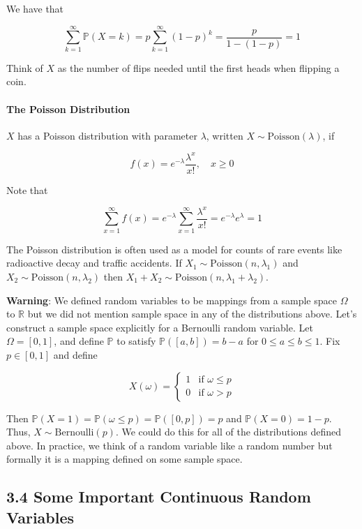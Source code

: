 We have that

\[ \sum_{k=1}^\infty \mathbb{P}(X = k) = p \sum_{k=1}^\infty (1 - p)^k = \frac{p}{1 - (1 - p)} = 1 \]

Think of \(X\) as the number of flips needed until the first heads when
flipping a coin.

\paragraph{The Poisson Distribution}\label{the-poisson-distribution}

\(X\) has a Poisson distribution with parameter \(\lambda\), written
\(X \sim \text{Poisson}(\lambda)\), if

\[ f(x) = e^{-\lambda} \frac{\lambda^x}{x!}, \quad x \geq 0 \]

Note that

\[ \sum_{x=1}^\infty f(x) = e^{-\lambda} \sum_{x=1}^\infty \frac{\lambda^x}{x!} = e^{-\lambda} e^\lambda = 1 \]

The Poisson distribution is often used as a model for counts of rare
events like radioactive decay and traffic accidents. If
\(X_1 \sim \text{Poisson}(n, \lambda_1)\) and
\(X_2 \sim \text{Poisson}(n, \lambda_2)\) then
\(X_1 + X_2 \sim \text{Poisson}(n, \lambda_1 + \lambda_2)\).

\textbf{Warning}: We defined random variables to be mappings from a
sample space \(\Omega\) to \(\mathbb{R}\) but we did not mention sample
space in any of the distributions above. Let's construct a sample space
explicitly for a Bernoulli random variable. Let \(\Omega = [0, 1]\), and
define \(\mathbb{P}\) to satisfy \(\mathbb{P}([a, b]) = b - a\) for
\(0 \leq a \leq b \leq 1\). Fix \(p \in [0, 1]\) and define

\[ X(\omega) = \begin{cases}
1 &\text{if }\omega \leq p \\
0 &\text{if }\omega > p
\end{cases} \]

Then
\(\mathbb{P}(X = 1) = \mathbb{P}(\omega \leq p) = \mathbb{P}([0, p]) = p\)
and \(\mathbb{P}(X = 0) = 1 - p\). Thus, \(X \sim \text{Bernoulli}(p)\).
We could do this for all of the distributions defined above. In
practice, we think of a random variable like a random number but
formally it is a mapping defined on some sample space.

\subsection{3.4 Some Important Continuous Random
Variables}\label{some-important-continuous-random-variables}

